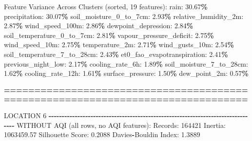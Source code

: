 \documentclass[
  letterpaper,
  DIV=11,
  numbers=noendperiod]{scrartcl}
\newenvironment{Shaded}{\begin{snugshade}}{\end{snugshade}}
\newcommand{\BuiltInTok}[1]{#1}
\newcommand{\DecValTok}[1]{\textcolor[rgb]{0.00,0.00,0.81}{#1}}
\newcommand{\FloatTok}[1]{\textcolor[rgb]{0.00,0.00,0.81}{#1}}
\newcommand{\NormalTok}[1]{#1}
\newcommand{\OperatorTok}[1]{\textcolor[rgb]{0.81,0.36,0.00}{\textbf{#1}}}
\begin{document}
\begin{Shaded}
\begin{Highlighting}[]
\NormalTok{  Feature Variance Across Clusters (}\BuiltInTok{sorted}\NormalTok{, }\DecValTok{19}\NormalTok{ features):}
\NormalTok{    rain: }\FloatTok{30.67}\OperatorTok{\%}
\NormalTok{    precipitation: }\FloatTok{30.07}\OperatorTok{\%}
\NormalTok{    soil\_moisture\_0\_to\_7cm: }\FloatTok{2.93}\OperatorTok{\%}
\NormalTok{    relative\_humidity\_2m: }\FloatTok{2.87}\OperatorTok{\%}
\NormalTok{    wind\_speed\_100m: }\FloatTok{2.86}\OperatorTok{\%}
\NormalTok{    dewpoint\_depression: }\FloatTok{2.84}\OperatorTok{\%}
\NormalTok{    soil\_temperature\_0\_to\_7cm: }\FloatTok{2.81}\OperatorTok{\%}
\NormalTok{    vapour\_pressure\_deficit: }\FloatTok{2.75}\OperatorTok{\%}
\NormalTok{    wind\_speed\_10m: }\FloatTok{2.75}\OperatorTok{\%}
\NormalTok{    temperature\_2m: }\FloatTok{2.71}\OperatorTok{\%}
\NormalTok{    wind\_gusts\_10m: }\FloatTok{2.54}\OperatorTok{\%}
\NormalTok{    soil\_temperature\_7\_to\_28cm: }\FloatTok{2.43}\OperatorTok{\%}
\NormalTok{    et0\_fao\_evapotranspiration: }\FloatTok{2.41}\OperatorTok{\%}
\NormalTok{    previous\_night\_low: }\FloatTok{2.17}\OperatorTok{\%}
\NormalTok{    cooling\_rate\_6h: }\FloatTok{1.89}\OperatorTok{\%}
\NormalTok{    soil\_moisture\_7\_to\_28cm: }\FloatTok{1.62}\OperatorTok{\%}
\NormalTok{    cooling\_rate\_12h: }\FloatTok{1.61}\OperatorTok{\%}
\NormalTok{    surface\_pressure: }\FloatTok{1.50}\OperatorTok{\%}
\NormalTok{    dew\_point\_2m: }\FloatTok{0.57}\OperatorTok{\%}

\OperatorTok{================================================================================}

\NormalTok{LOCATION }\DecValTok{6}
\OperatorTok{{-}{-}{-}{-}{-}{-}{-}{-}{-}{-}{-}{-}{-}{-}{-}{-}{-}{-}{-}{-}{-}{-}{-}{-}{-}{-}{-}{-}{-}{-}{-}{-}{-}{-}{-}{-}{-}{-}{-}{-}{-}{-}{-}{-}{-}{-}{-}{-}{-}{-}{-}{-}{-}{-}{-}{-}{-}{-}{-}{-}{-}{-}{-}{-}{-}{-}{-}{-}{-}{-}{-}{-}{-}{-}{-}{-}{-}{-}{-}{-}}
\NormalTok{WITHOUT AQI (}\BuiltInTok{all}\NormalTok{ rows, no AQI features):}
\NormalTok{  Records: }\DecValTok{164421}
\NormalTok{  Inertia: }\FloatTok{1063459.57}
\NormalTok{  Silhouette Score: }\FloatTok{0.2088}
\NormalTok{  Davies}\OperatorTok{{-}}\NormalTok{Bouldin Index: }\FloatTok{1.3889}


\end{Highlighting}
\end{Shaded}
\end{document}

